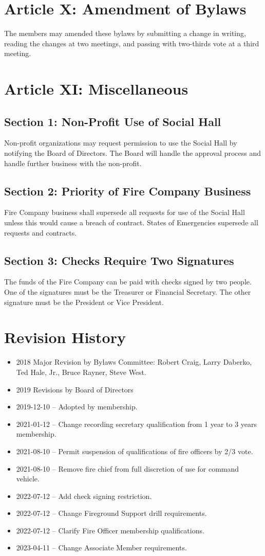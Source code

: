 ﻿\documentclass[12pt,letterpaper]{article}
\begin{document}
\section*{Article X: Amendment of Bylaws}
The members may amended these bylaws by submitting a change in writing, reading the changes at two meetings, and passing with two-thirds vote at a third meeting.

\section*{Article XI: Miscellaneous}

\subsection*{Section 1: Non-Profit Use of Social Hall}
Non-profit organizations may request permission to use the Social Hall by notifying the Board of Directors.  The Board will handle the approval process and handle further business with the non-profit.
\subsection*{Section 2: Priority of Fire Company Business}
Fire Company business shall supersede all requests for use of the Social Hall unless this would cause a breach of contract.  States of Emergencies supersede all requests and contracts.

\subsection*{Section 3: Checks Require Two Signatures}
The funds of the Fire Company can be paid with checks signed by two people.  One of the signatures must be the Treasurer or Financial Secretary.  The other signature must be the President or Vice President.


\section*{Revision History}
\begin{itemize}
\item 2018 Major Revision by Bylaws Committee: Robert Craig, Larry Daberko, Ted Hale, Jr., Bruce Rayner, Steve West.
\item 2019 Revisions by Board of Directors
\item 2019-12-10 – Adopted by membership.
\item 2021-01-12 – Change recording secretary qualification from 1 year to 3 years membership.
\item 2021-08-10 – Permit suspension of qualifications of fire officers by 2/3 vote.
\item 2021-08-10 – Remove fire chief from full discretion of use for command vehicle.
\item 2022-07-12 – Add check signing restriction.
\item 2022-07-12 – Change Fireground Support drill requirements.
\item 2022-07-12 – Clarify Fire Officer membership qualifications.
\item 2023-04-11 – Change Associate Member requirements.
\end{itemize}
\end{document}
